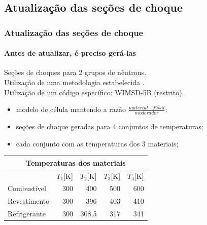\documentclass[svgnames,smaller,table]{beamer}
\begin{document}
\subsection{Atualização das seções de choque}
\begin{frame}
  \frametitle{Atualização das seções de choque}
  \framesubtitle{Antes de atualizar, é preciso \textbf{gerá-las}}
  Seções de choques para 2 grupos de nêutrons.\\
  \vspace{0.2cm}
  Utilização de uma metodologia estabelecida \cite{Reis2015}.\\
  \vspace{0.2cm}
  Utilização de um código específico: WIMSD-5B (\alert{restrito}).\\
  \vspace{0.2cm}
  \begin{itemize}
  \item modelo de célula mantendo a razão $\frac{material\quad físsil}{moderador}$;
  \item seções de choque geradas para 4 conjuntos de temperaturas;
  \item cada conjunto com as temperaturas dos 3 materiais;
  \end{itemize}
  \centering
  \vspace{0.2cm}
  \begin{tabular}{lrrrr}
    \multicolumn{5}{c}{Temperaturas dos materiais}                                                                                                       \\ \hline
    & \multicolumn{1}{l}{$T_1${[}K{]}} & \multicolumn{1}{l}{$T_2${[}K{]}} & \multicolumn{1}{l}{$T_3${[}K{]}} & \multicolumn{1}{l}{$T_4${[}K{]}}      \\ \hline
    Combustível  & 300                             & 400                             & 500                             & 600                             \\ \hline
    Revestimento & 300                             & 396                             & 403                             & 410                             \\ \hline
    Refrigerante & 300                             & 308,5                           & 317                             & 341                            
  \end{tabular}

\end{frame}
\end{document}
